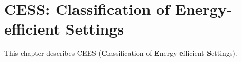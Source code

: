 \chapter{CESS: Classification of Energy-efficient Settings}

This chapter describes CEES (\textbf{C}lassification of \textbf{E}nergy-\textbf{e}fficient \textbf{S}ettings).






